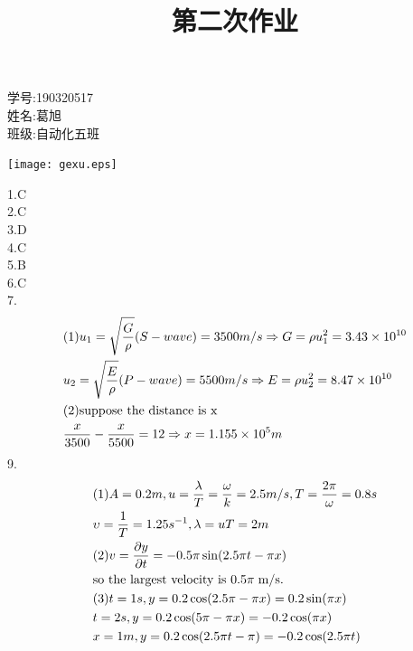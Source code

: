 \documentclass{article}
\begin{document}
\title{第二次作业}
\maketitle
\begin{minipage}[b]{0.5\linewidth}
学号:190320517\\
姓名:葛旭\\
班级:自动化五班\\
\end{minipage}
\hfill
\begin{minipage}[b]{0.5\linewidth}
\texttt{[image: gexu.eps]}\\
\end{minipage}
1.C\\
2.C\\
3.D\\
4.C\\
5.B\\
6.C\\
7.\[\begin{gathered}
(1){u_1} = \sqrt {\frac{G}{\rho }} (S - wave) = 3500m/s \Rightarrow G = \rho u_1^2 = 3.43 \times {10^{10}} \hfill \\
{u_2} = \sqrt {\frac{E}{\rho }} (P - wave) = 5500m/s \Rightarrow E = \rho u_2^2 = 8.47 \times {10^{10}} \hfill \\
(2){\text{suppose the distance is x}} \hfill \\
\frac{x}{{3500}} - \frac{x}{{5500}} = 12 \Rightarrow x = 1.155 \times {10^5}m \hfill \\ 
\end{gathered} \]
9.\[\begin{gathered}
(1)A = 0.2m,u = \frac{\lambda }{T} = \frac{\omega }{k} = 2.5m/s,T = \frac{{2\pi }}{\omega } = 0.8s \hfill \\
\upsilon  = \frac{1}{T} = 1.25{s^{ - 1}},\lambda  = uT = 2m \hfill \\
(2)v = \frac{{\partial y}}{{\partial t}} =  - 0.5\pi \sin (2.5\pi t - \pi x) \hfill \\
{\text{so the largest velocity is 0}}{\text{.5}}\pi {\kern 1pt} {\kern 1pt} {\kern 1pt} {\text{m/s}}{\text{.}} \hfill \\
(3)t = 1s,y = 0.2\cos (2.5\pi  - \pi x) = 0.2\sin (\pi x) \hfill \\
t = 2s,y = 0.2\cos (5\pi  - \pi x) =  - 0.2\cos (\pi x) \hfill \\
x = 1m,y = 0.2\cos (2.5\pi t - \pi ) =  - 0.2\cos (2.5\pi t) \hfill \\ 
\end{gathered} \]
\end{document}
